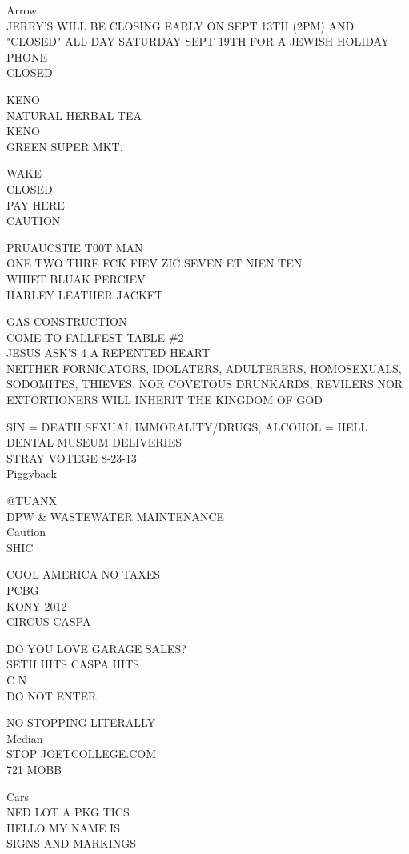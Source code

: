 \documentclass[10pt,letterpaper]{article}
\begin{document}
Arrow\\
JERRY'S WILL BE CLOSING EARLY ON SEPT 13TH (2PM) AND "CLOSED" ALL DAY SATURDAY SEPT 19TH FOR A JEWISH HOLIDAY\\
PHONE\\
CLOSED

KENO\\
NATURAL HERBAL TEA\\
KENO\\
GREEN SUPER MKT.

WAKE\\
CLOSED\\
PAY HERE\\
CAUTION

PRUAUCSTIE T00T MAN\\
ONE TWO THRE FCK FIEV ZIC SEVEN ET NIEN TEN\\
WHIET BLUAK PERCIEV\\
HARLEY LEATHER JACKET

GAS CONSTRUCTION\\
COME TO FALLFEST TABLE \#2\\
JESUS ASK'S 4 A REPENTED HEART\\
NEITHER FORNICATORS, IDOLATERS, ADULTERERS, HOMOSEXUALS, SODOMITES, THIEVES, NOR COVETOUS DRUNKARDS, REVILERS NOR EXTORTIONERS WILL INHERIT THE KINGDOM OF GOD

SIN = DEATH SEXUAL IMMORALITY/DRUGS, ALCOHOL = HELL\\
DENTAL MUSEUM DELIVERIES\\
STRAY VOTEGE 8{-}23{-}13\\
Piggyback

@TUANX\\
DPW \& WASTEWATER MAINTENANCE\\
Caution\\
SHIC

COOL AMERICA NO TAXES\\
PCBG\\
KONY 2012\\
CIRCUS CASPA

DO YOU LOVE GARAGE SALES?\\
SETH HITS CASPA HITS\\
C N\\
DO NOT ENTER

NO STOPPING LITERALLY\\
Median\\
STOP JOETCOLLEGE.COM\\
721 MOBB

Cars\\
NED LOT A PKG TICS\\
HELLO MY NAME IS\\
SIGNS AND MARKINGS
\end{document}
